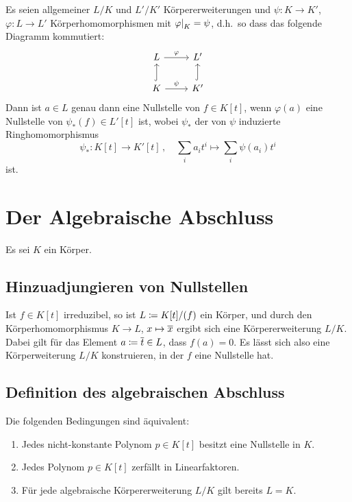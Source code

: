 \begin{remark}
  Es seien allgemeiner $L/K$ und $L'/K'$ Körpererweiterungen und $\psi \colon K \to K'$, $\varphi  \colon L \to L'$ Körperhomomorphismen mit $\restrict{\varphi }{K} = \psi$, d.h.\ so dass das folgende Diagramm kommutiert:
  \[
    \begin{tikzcd}
        L
        \arrow{r}[above]{\varphi}
      & L'
      \\
        K
        \arrow[hook]{u}
        \arrow{r}[above]{\psi}
      & K'
        \arrow[hook]{u}
    \end{tikzcd}
  \]
  Dann ist $a \in L$ genau dann eine Nullstelle von $f \in K[t]$, wenn $\varphi(a)$ eine Nullstelle von $\psi_*(f) \in L'[t]$ ist, wobei $\psi_*$ der von $\psi$ induzierte Ringhomomorphismus
  \[
            \psi_*
    \colon  K[t]
    \to     K'[t] \,,
    \quad   \sum_i a_i t^i
    \mapsto \sum_i \psi(a_i) t^i
  \]
  ist.
\end{remark}





\section{Der Algebraische Abschluss}

Es sei $K$ ein Körper.



\subsection{Hinzuadjungieren von Nullstellen}

Ist $f \in K[t]$ irreduzibel, so ist $L \coloneqq K[t]/(f)$ ein Körper, und durch den Körperhomomorphismus $K \to L$, $x \mapsto \overline{x}$ ergibt sich eine Körpererweiterung $L/K$.
Dabei gilt für das Element $a \coloneqq \overline{t} \in L$, dass $f(a) = 0$.
Es lässt sich also eine Körperweiterung $L/K$ konstruieren, in der $f$ eine Nullstelle hat.



\subsection{Definition des algebraischen Abschluss}

\begin{lemma}
  Die folgenden Bedingungen sind äquivalent:
  \begin{enumerate}
    \item
      Jedes nicht-konstante Polynom $p \in K[t]$ besitzt eine Nullstelle in $K$.
    \item
      Jedes Polynom $p \in K[t]$ zerfällt in Linearfaktoren.
    \item
      Für jede algebraische Körpererweiterung $L/K$ gilt bereits $L = K$.
  \end{enumerate}
\end{lemma}

